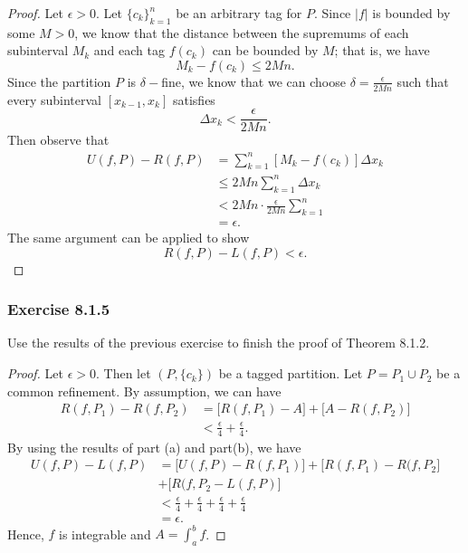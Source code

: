 \begin{enumerate}
        \begin{proof}
            Let \( \epsilon > 0  \). Let \( \{ c_{k } \}_{k=1}^{n}  \) be an arbitrary tag for \( P  \). Since \( | f |  \) is bounded by some \( M > 0  \), we know that the distance between the supremums of each subinterval \( M_{k} \) and each tag \( f(c_{k }) \) can be bounded by \( M  \); that is, we have 
            \[   M_{k } - f(c_{k }) \leq  2Mn. \] Since the partition \( P  \) is \( \delta- \)fine, we know that we can choose \( \delta = \frac{ \epsilon  }{ 2Mn }  \) such that every subinterval \( [x_{k-1}, x_{k}] \) satisfies 
            \[ \Delta x_{k } < \frac{ \epsilon  }{ 2Mn }. \] Then observe that 
        \begin{align*}
            U(f,P) - R(f,P)   &= \sum_{ k=1 }^{ n } [ M_{k } - f(c_{k })]  \Delta x_{k }\\
                              &\leq 2Mn \sum_{ k=1 }^{n } \Delta x_{k }  \\ 
                              &< 2Mn \cdot \frac{ \epsilon  }{ 2Mn } \sum_{ k=1 }^{ n } \\
                              &= \epsilon.
        \end{align*}
        The same argument can be applied to show 
        \[  R(f,P) - L(f,P) < \epsilon. \]
        \end{proof}
\end{enumerate}

\subsubsection{Exercise 8.1.5} Use the results of the previous exercise to finish the proof of Theorem 8.1.2.

\begin{proof}
Let \( \epsilon > 0  \). Then let \( (P, \{ c_{k } \}) \) be a tagged partition. Let \( P = P_{1} \cup P_{2} \) be a common refinement. By assumption, we can have 
\begin{align*}
    R(f,P_{1}) - R(f, P_{2}) &= \big[ R(f, P_{1}) - A  \big] + \big[ A - R(f, P_{2})\big]  \\
                             &< \frac{ \epsilon  }{ 4 }  + \frac{ \epsilon  }{ 4 }.
\end{align*} By using the results of part (a) and part(b), we have 
\begin{align*}
    U(f,P) - L(f,P) &= \big[ U(f,P) - R(f,P_{1}) \big]  + \big[ R(f,P_{1}) - R(f,P_{2} \big] \\ 
                    &+ \big[ R(f,P_{2} - L(f,P) \big]  \\
                    &< \frac{ \epsilon  }{ 4 }  + \frac{ \epsilon  }{ 4 }  + \frac{ \epsilon  }{ 4 }  + \frac{ \epsilon  }{ 4  } \\
                    &= \epsilon.
\end{align*}
Hence, \( f  \) is integrable and \( A = \int_{ a }^{ b } f  \).
\end{proof}

